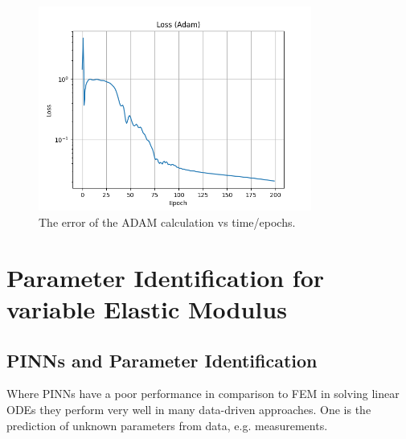 \documentclass[a4paper,11pt]{article}
\begin{document}
\begin{figure}[H]
    \centering
    \includegraphics[width=0.8\textwidth]{Charts/Error_Adam.png}
    \caption{The error of the ADAM calculation vs time/epochs.}
    \label{fig:example}
\end{figure}

\section{Parameter Identification for variable Elastic Modulus}

\subsection*{PINNs and Parameter Identification}
Where PINNs have a poor performance in comparison to FEM in solving linear ODEs they perform very well in many data-driven approaches. One is the prediction of unknown parameters from data, e.g. measurements.
\end{document}
